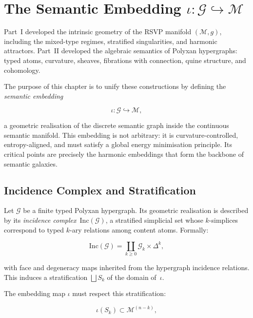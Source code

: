 \chapter{The Semantic Embedding \texorpdfstring{$\iota : \mathcal{G} \hookrightarrow \mathcal{M}$}{iota : G ↪ M}}
\label{ch:semantic-embedding}

Part~I developed the intrinsic geometry of the RSVP manifold
$(\mathcal{M},g)$, including the mixed-type regimes, stratified
singularities, and harmonic attractors.  
Part~II developed the algebraic semantics of Polyxan hypergraphs:
typed atoms, curvature, sheaves, fibrations with connection, quine
structure, and cohomology.

The purpose of this chapter is to unify these constructions by defining
the \emph{semantic embedding}

\begin{equation}
\label{eq:iota-def}
\iota : \mathcal{G} \hookrightarrow \mathcal{M},
\end{equation}

a geometric realisation of the discrete semantic graph inside the
continuous semantic manifold.  
This embedding is not arbitrary: it is curvature-controlled,
entropy-aligned, and must satisfy a global energy minimisation
principle.  Its critical points are precisely the harmonic embeddings
that form the backbone of semantic galaxies.

\section{Incidence Complex and Stratification}
Let $\mathcal{G}$ be a finite typed Polyxan hypergraph.
Its geometric realisation is described by its \emph{incidence
complex}~$\mathrm{Inc}(\mathcal{G})$, a stratified simplicial set whose
$k$-simplices correspond to typed $k$-ary relations among content atoms.
Formally:

\begin{equation}
\mathrm{Inc}(\mathcal{G})
  = \coprod_{k \ge 0} \mathcal{G}_k \times \Delta^k,
\end{equation}

with face and degeneracy maps inherited from the hypergraph incidence
relations.  
This induces a stratification
$\bigsqcup S_k$ of the domain of~$\iota$.

The embedding map $\iota$ must respect this stratification:

\begin{equation}
\label{eq:stratified-embedding}
\iota(S_k) \subset \mathcal{M}^{(n-k)},
\end{equation}


